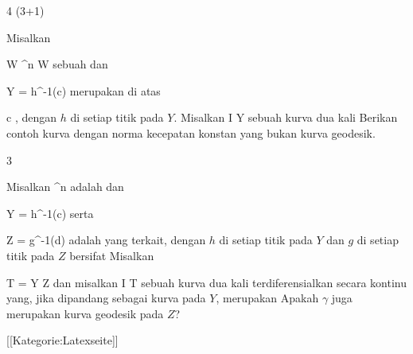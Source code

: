 {4 (3+1)}
{

Misalkan

\mavergleichskette
{\vergleichskette
{ W
}
{ \subseteq }{ \R^n
}
{  }{
}
{    }{
}
{   }{
}
}
{}{}{}
 { W } { \R
} {}
sebuah
dan

\mavergleichskette
{\vergleichskette
{ Y
}
{ = }{ h^{-1}(c)
}
{  }{
}
{    }{
}
{   }{
}
}
{}{}{}
merupakan
di atas

\mavergleichskette
{\vergleichskette
{ c
}
{ \in }{ \R
}
{  }{
}
{    }{
}
{   }{
}
}
{}{}{,}
dengan $h$
di setiap titik pada $Y$. Misalkan
\maabbdisp {\gamma} { I } { Y
} {}
sebuah kurva dua kali
 {Berikan contoh kurva dengan norma kecepatan konstan yang bukan kurva geodesik.
}

}
{} {}

{3}
{

Misalkan
 {\R^n } { \R
} {}
adalah
dan

\mavergleichskette
{\vergleichskette
{ Y
}
{ = }{ h^{-1}(c)
}
{  }{
}
{    }{
}
{   }{
}
}
{}{}{}
serta

\mavergleichskette
{\vergleichskette
{ Z
}
{ = }{ g^{-1}(d)
}
{  }{
}
{    }{
}
{   }{
}
}
{}{}{}
adalah
yang terkait, dengan $h$ di setiap titik pada $Y$ dan $g$ di setiap titik pada $Z$ bersifat
Misalkan

\mavergleichskette
{\vergleichskette
{ T
}
{ = }{ Y \cap Z
}
{  }{
}
{    }{
}
{   }{
}
}
{}{}{}
dan misalkan
\maabbdisp {\gamma} { I } { T
} {}
sebuah kurva dua kali terdiferensialkan secara kontinu yang, jika dipandang sebagai kurva pada $Y$, merupakan
Apakah $\gamma$ juga merupakan kurva geodesik pada $Z$?

}
{} {}

 [[Kategorie:Latexseite]]
